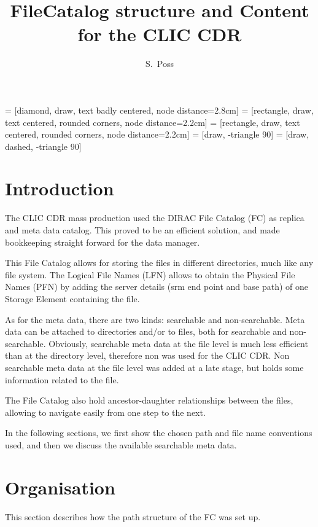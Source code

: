 \documentclass[a4paper,12pt]{article}
\title{FileCatalog structure and Content for the CLIC CDR}
\author{S.~Poss}
\begin{document}
 = [diamond, draw, text badly centered, node distance=2.8cm]
 = [rectangle, draw, text centered, rounded corners, node distance=2.2cm]
 = [rectangle, draw, text centered, rounded corners, node distance=2.2cm]
 = [draw, -triangle 90]
 = [draw, dashed, -triangle 90]

\maketitle
{}

\tableofcontents

\section{Introduction}
The CLIC CDR mass production used the DIRAC File Catalog (FC) as replica and
meta data catalog. This proved to be an efficient solution, and made bookkeeping
straight forward for the data manager. 

This File Catalog allows for storing the
files in different directories, much like any file system. The Logical File
Names (LFN) allows to obtain the Physical File Names (PFN) by adding the server
details (srm end point and base path) of one Storage Element containing the
file. 

As for the meta data, there are two kinds: searchable and non-searchable. Meta
data can be attached to directories and/or to files, both for searchable and
non-searchable. Obviously, searchable meta data at the file level is much less
efficient than at the directory level, therefore non was used for the CLIC CDR.
Non searchable meta data at the file level was added at a late stage, but holds
some information related to the file.

The File Catalog also hold ancestor-daughter relationships between the files,
allowing to navigate easily from one step to the next.

In the following sections, we first show the chosen path and file name
conventions used, and then we discuss the available searchable meta data.

\section{Organisation}
This section describes how the path structure of the FC was set up. 
\end{document}
